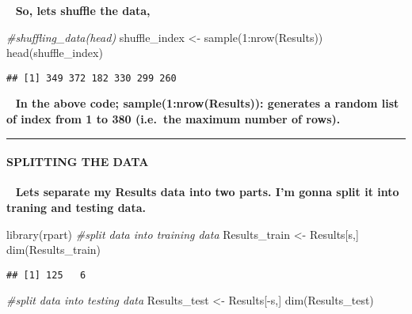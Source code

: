\documentclass[
]{article}
\newenvironment{Shaded}{\begin{snugshade}}{\end{snugshade}}
\newcommand{\CommentTok}[1]{\textcolor[rgb]{0.56,0.35,0.01}{\textit{#1}}}
\newcommand{\DecValTok}[1]{\textcolor[rgb]{0.00,0.00,0.81}{#1}}
\newcommand{\FunctionTok}[1]{\textcolor[rgb]{0.00,0.00,0.00}{#1}}
\newcommand{\NormalTok}[1]{#1}
\newcommand{\OtherTok}[1]{\textcolor[rgb]{0.56,0.35,0.01}{#1}}
\newcommand{\SpecialCharTok}[1]{\textcolor[rgb]{0.00,0.00,0.00}{#1}}
\begin{document}
~ \textbf{So, lets shuffle the data,}

\begin{Shaded}
\begin{Highlighting}[]
\CommentTok{\#shuffling\_data(head)}
\NormalTok{shuffle\_index }\OtherTok{\textless{}{-}} \FunctionTok{sample}\NormalTok{(}\DecValTok{1}\SpecialCharTok{:}\FunctionTok{nrow}\NormalTok{(Results))}
\FunctionTok{head}\NormalTok{(shuffle\_index)}
\end{Highlighting}
\end{Shaded}

\begin{verbatim}
## [1] 349 372 182 330 299 260
\end{verbatim}

~ \textbf{In the above code; sample(1:nrow(Results)): generates a random
list of index from 1 to 380 (i.e.~the maximum number of rows).}

\begin{center}\rule{0.5\linewidth}{0.5pt}\end{center}

\hypertarget{splitting-the-data}{%
\paragraph{\texorpdfstring{\textbf{SPLITTING THE
DATA}}{SPLITTING THE DATA}}\label{splitting-the-data}}

~ \textbf{Lets separate my Results data into two parts. I'm gonna split
it into traning and testing data.}

\begin{Shaded}
\begin{Highlighting}[]
\FunctionTok{library}\NormalTok{(rpart)}
\CommentTok{\#split data into training data}
\NormalTok{Results\_train }\OtherTok{\textless{}{-}}\NormalTok{ Results[s,]}
\FunctionTok{dim}\NormalTok{(Results\_train)}
\end{Highlighting}
\end{Shaded}

\begin{verbatim}
## [1] 125   6
\end{verbatim}

\begin{Shaded}
\begin{Highlighting}[]
\CommentTok{\#split data into testing data}
\NormalTok{Results\_test }\OtherTok{\textless{}{-}}\NormalTok{ Results[}\SpecialCharTok{{-}}\NormalTok{s,]}
\FunctionTok{dim}\NormalTok{(Results\_test)}
\end{Highlighting}
\end{Shaded}
\end{document}
